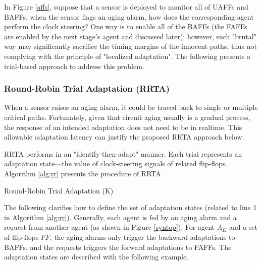 In Figure \ref{affs}, suppose that a sensor is deployed to monitor all of UAFFs and BAFFs, when the sensor flags an aging alarm, how does the corresponding agent perform the clock steering? One way is to enable all of the BAFFs (the FAFFs are enabled by the next stage's agent and discussed later); however, such "brutal" way may significantly sacrifice the timing margins of the innocent paths, thus not complying with the principle of "localized adaptation". The following presents a trial-based approach to address this problem.

\subsubsection{Round-Robin Trial Adaptation (RRTA)}\label{section_rrta}

When a sensor raises an aging alarm, it could be traced back to single or multiple critical paths. Fortunately, given that circuit aging usually is a gradual process, the response of an intended adaptation does not need to be in realtime. This allowable adaptation latency can justify the proposed RRTA approach below.

RRTA performs in an "identify-then-adapt" manner. Each trial represents an adaptation state---the value of clock-steering signals of related flip-flops. Algorithm \ref{alg:rr} presents the procedure of RRTA.


\begin{algorithm}\label{alg:rr}
  \caption{Round-Robin Trial Adaptation (K)}
\end{algorithm}



The following clarifies how to define the set of adaptation states (related to line 1 in Algorithm \ref{alg:rr}). Generally, each agent is fed by an aging alarm and a request from another agent (as shown in Figure \ref{syntop}). For agent $A_K$ and a set of flip-flops $FF$, the aging alarms only trigger the backward adaptations to BAFFs, and the requests triggers the forward adaptations to FAFFs. The adaptation states are described with the following example.

